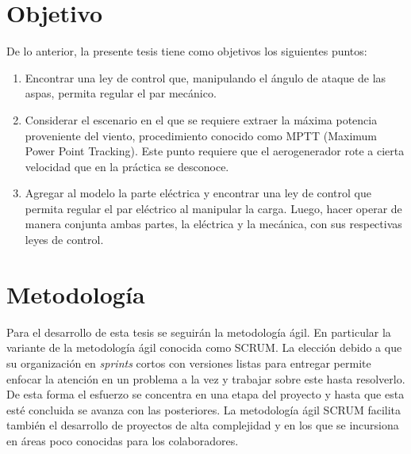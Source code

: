 \section{Objetivo}
\noindent De lo anterior, la presente tesis tiene como objetivos los siguientes puntos:
\begin{enumerate}
\item Encontrar una ley de control que, manipulando el ángulo de ataque de las aspas, permita regular el par mecánico.
\item Considerar el escenario en el que se requiere extraer la máxima potencia proveniente del viento, procedimiento conocido como MPTT (Maximum Power Point Tracking). Este punto requiere que el aerogenerador rote a cierta velocidad que en la práctica se desconoce.
\item Agregar al modelo la parte eléctrica y encontrar una ley de control que permita regular el par eléctrico al manipular la carga. Luego, hacer operar de manera conjunta ambas partes, la eléctrica y la mecánica, con sus respectivas leyes de control. 
\end{enumerate}


\section{Metodología}

\noindent Para el desarrollo de esta tesis se seguirán la metodología ágil. En particular la variante de la metodología ágil conocida como SCRUM. La elección debido a que su organización en \emph{sprints} cortos con versiones listas para entregar permite enfocar la atención en un problema a la vez y trabajar sobre este hasta resolverlo. De esta forma el esfuerzo se concentra en una etapa del proyecto y hasta que esta esté concluida se avanza con las posteriores. La metodología ágil SCRUM facilita también el desarrollo de proyectos de alta complejidad y en los que se incursiona en áreas poco conocidas para los colaboradores. 